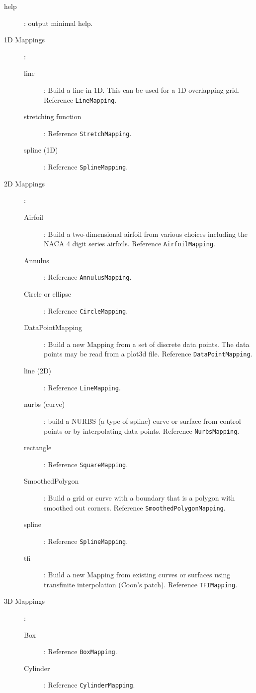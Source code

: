 \documentclass[xcolor=rgb,svgnames,dvipsnames]{article}
\begin{document}
\begin{description}
  \item[help] : output minimal help.
  \item[1D Mappings] :
  \begin{description}
    \item[line] : Build a line in 1D. This can be used for a 1D overlapping grid. Reference {\tt LineMapping}.
    \item[stretching function] : Reference {\tt StretchMapping}.
    \item[spline (1D)] : Reference {\tt SplineMapping}.
  \end{description}
  \item[2D Mappings] :
  \begin{description}
    \item[Airfoil] : Build a two-dimensional airfoil from various choices including the NACA 4 digit series
      airfoils.  Reference {\tt AirfoilMapping}.
    \item[Annulus] :  Reference {\tt AnnulusMapping}.
    \item[Circle or ellipse] :  Reference {\tt CircleMapping}.
    \item[DataPointMapping] : Build a new Mapping from a set of discrete data points.
        The data points may be read from a plot3d file. Reference {\tt DataPointMapping}.
    \item[line (2D)] : Reference {\tt LineMapping}.
    \item[nurbs (curve)] : build a NURBS (a type of spline) curve or surface from control points or by
      interpolating data points.  Reference {\tt NurbsMapping}.
    \item[rectangle] :  Reference {\tt SquareMapping}. 
    \item[SmoothedPolygon] : Build a grid or curve with a boundary that is a polygon with
        smoothed out corners. Reference {\tt SmoothedPolygonMapping}. 
    \item[spline] : Reference {\tt SplineMapping}.
    \item[tfi] :  Build a new Mapping from existing curves or surfaces using 
          transfinite interpolation (Coon's patch). Reference {\tt TFIMapping}.
  \end{description}
  \item[3D Mappings] :
  \begin{description}
    \item[Box] : Reference {\tt BoxMapping}. 
    \item[Cylinder] :  Reference {\tt CylinderMapping}. 

\end{description}
\end{description}
\end{document}
